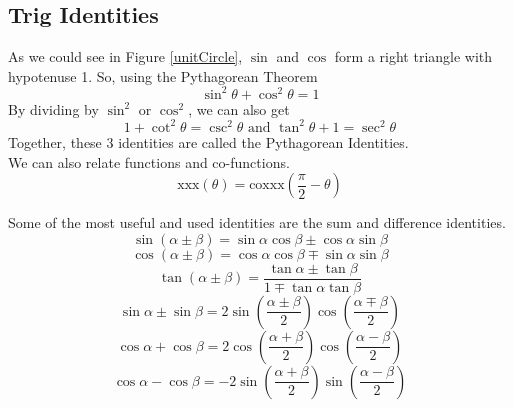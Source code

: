 \subsection{Trig Identities}
\noindent
As we could see in Figure \ref{unitCircle}, $\sin$ and $\cos$ form a right triangle with hypotenuse 1. So, using the Pythagorean Theorem
\begin{equation*}
	\sin^2{\theta} + \cos^2{\theta} = 1
\end{equation*}
By dividing by $\sin^2$ or $\cos^2$, we can also get
\begin{equation*}
	1 + \cot^2{\theta} = \csc^2{\theta} \text{ and } \tan^2{\theta} + 1 = \sec^2{\theta}
\end{equation*}
Together, these 3 identities are called the Pythagorean Identities.\\

\noindent
We can also relate functions and co-functions.
\begin{equation*}
	\text{xxx}(\theta) = \text{coxxx}\left(\frac{\pi}{2} - \theta\right)
\end{equation*}

Some of the most useful and used identities are the sum and difference identities.
\begin{equation*}
	\sin{\left(\alpha \pm \beta\right)} = \sin{\alpha}\cos{\beta} \pm \cos{\alpha}\sin{\beta}
\end{equation*} \begin{equation*}
	\cos{\left(\alpha \pm \beta\right)} = \cos{\alpha}\cos{\beta} \mp \sin{\alpha}\sin{\beta}
\end{equation*} \begin{equation*}
	\tan{\left(\alpha \pm \beta\right)} = \frac{\tan{\alpha} \pm \tan{\beta}}{1 \mp \tan{\alpha}\tan{\beta}}
\end{equation*} \begin{equation*}
	\sin{\alpha} \pm \sin{\beta} = 2\sin{\left(\frac{\alpha \pm \beta}{2}\right)}\cos{\left(\frac{\alpha \mp \beta}{2}\right)}
\end{equation*} \begin{equation*}
	\cos{\alpha} + \cos{\beta} = 2\cos{\left(\frac{\alpha + \beta}{2}\right)}\cos{\left(\frac{\alpha - \beta}{2}\right)}
\end{equation*} \begin{equation*}
	\cos{\alpha} - \cos{\beta} = -2\sin{\left(\frac{\alpha + \beta}{2}\right)}\sin{\left(\frac{\alpha - \beta}{2}\right)}
\end{equation*}